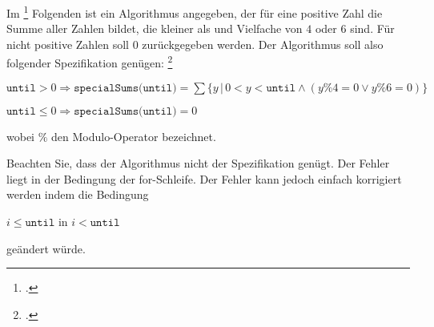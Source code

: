 \documentclass{bschlangaul-aufgabe}
\begin{document}

\let\c=\bKontrollCode
\let\b=\bBedingung

Im
\footcite{examen:66116:2014:09} Folgenden ist ein Algorithmus angegeben,
der für eine positive Zahl  die Summe aller Zahlen
bildet, die kleiner als  und Vielfache von $4$ oder
$6$ sind. Für nicht positive Zahlen soll $0$ zurückgegeben werden. Der
Algorithmus soll also folgender Spezifikation genügen:
\footcite[Kontrollflussorientiertes Testen, Aufgabe 2]{sosy:ab:7}

\bigskip

{\footnotesize
\noindent
$\texttt{until} > 0 \Rightarrow \texttt{specialSums(until)} =
\sum \{y \, | \, 0 < y < \texttt{until} \land (y\%4 = 0 \lor y\%6 = 0)\}$

\noindent
$\texttt{until} \leq 0 \Rightarrow \texttt{specialSums(until)} = 0$
}

\bigskip\noindent
wobei $\%$ den Modulo-Operator bezeichnet.


\noindent
Beachten Sie, dass der Algorithmus nicht der Spezifikation genügt. Der
Fehler liegt in der Bedingung der for-Schleife. Der Fehler kann jedoch
einfach korrigiert werden indem die Bedingung

\begin{center}
$i \leq \texttt{until}$ in $i < \texttt{until}$
\end{center}

geändert würde.
\end{document}
